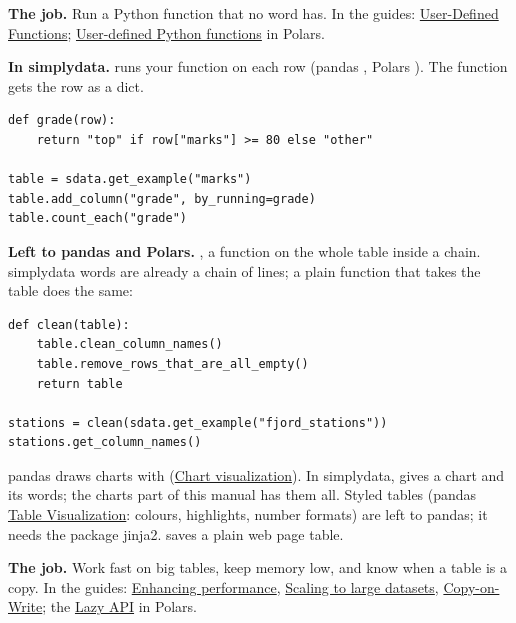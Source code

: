 
\textbf{The job.} Run a Python function that no word has. In the guides:
\href{https://pandas.pydata.org/docs/user_guide/user_defined_functions.html}{User-Defined Functions};
\href{https://docs.pola.rs/user-guide/expressions/user-defined-python-functions/}{User-defined Python
functions} in Polars.

\textbf{In simplydata.}  runs your function on each row (pandas
, Polars ). The function gets the row as a dict.

\begin{lstlisting}[style=py]
def grade(row):
    return "top" if row["marks"] >= 80 else "other"

table = sdata.get_example("marks")
table.add_column("grade", by_running=grade)
table.count_each("grade")
\end{lstlisting}

\textbf{Left to pandas and Polars.} , a function on the whole table inside a chain.
simplydata words are already a chain of lines; a plain function that takes the table does the same:

\begin{lstlisting}[style=py]
def clean(table):
    table.clean_column_names()
    table.remove_rows_that_are_all_empty()
    return table

stations = clean(sdata.get_example("fjord_stations"))
stations.get_column_names()
\end{lstlisting}


pandas draws charts with 
(\href{https://pandas.pydata.org/docs/user_guide/visualization.html}{Chart visualization}). In
simplydata,  gives a chart and its  words; the charts part of
this manual has them all. Styled tables (pandas
\href{https://pandas.pydata.org/docs/user_guide/style.html}{Table Visualization}: colours, highlights,
number formats) are left to pandas; it needs the package jinja2.  saves a
plain web page table.


\textbf{The job.} Work fast on big tables, keep memory low, and know when a table is a copy. In the
guides: \href{https://pandas.pydata.org/docs/user_guide/enhancingperf.html}{Enhancing performance},
\href{https://pandas.pydata.org/docs/user_guide/scale.html}{Scaling to large datasets},
\href{https://pandas.pydata.org/docs/user_guide/copy_on_write.html}{Copy-on-Write}; the
\href{https://docs.pola.rs/user-guide/concepts/lazy-api/}{Lazy API} in Polars.

